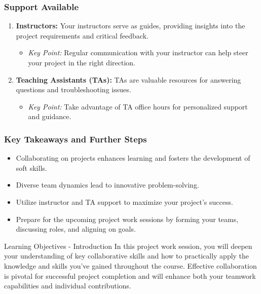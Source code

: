 \documentclass[aspectratio=169]{beamer}
\begin{document}
\begin{frame}[fragile]
    \frametitle{Support Available}
    \begin{enumerate}
        \item \textbf{Instructors:} Your instructors serve as guides, providing insights into the project requirements and critical feedback.
        \begin{itemize}
            \item \textit{Key Point:} Regular communication with your instructor can help steer your project in the right direction.
        \end{itemize}

        \item \textbf{Teaching Assistants (TAs):} TAs are valuable resources for answering questions and troubleshooting issues.
        \begin{itemize}
            \item \textit{Key Point:} Take advantage of TA office hours for personalized support and guidance.
        \end{itemize}
    \end{enumerate}
\end{frame}

\begin{frame}[fragile]
    \frametitle{Key Takeaways and Further Steps}
    \begin{itemize}
        \item Collaborating on projects enhances learning and fosters the development of soft skills.
        \item Diverse team dynamics lead to innovative problem-solving.
        \item Utilize instructor and TA support to maximize your project’s success.
        \item Prepare for the upcoming project work sessions by forming your teams, discussing roles, and aligning on goals.
    \end{itemize}
\end{frame}

\begin{frame}[fragile]{Learning Objectives - Introduction}
    In this project work session, you will deepen your understanding of key collaborative skills and how to practically apply the knowledge and skills you've gained throughout the course. Effective collaboration is pivotal for successful project completion and will enhance both your teamwork capabilities and individual contributions.
\end{frame}
\end{document}
